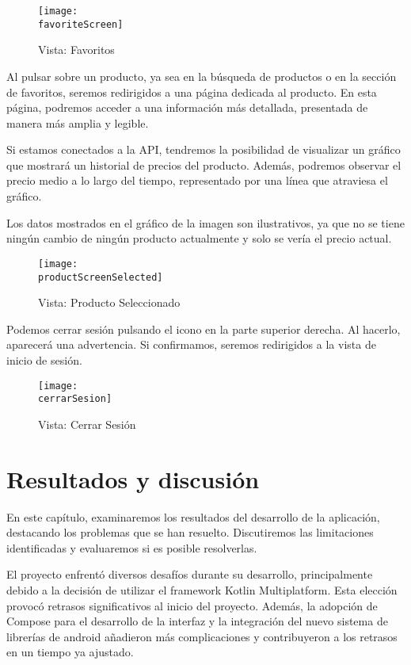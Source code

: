 \documentclass[12pt,twoside,titlepage]{report}
\newcommand{\favoriteScreen}{images/favorite_screen.png}
\newcommand{\cerrarSesion}{images/cerrar_sesion.png}
\newcommand{\productScreenSelected}{images/on_product_click.png}
\begin{document}
\begin{figure}[H]
    \centering
	\texttt{[image: \\favoriteScreen]}
    \caption{Vista: Favoritos}
    \label{fig:Google_SingIn}
\end{figure}

Al pulsar sobre un producto, ya sea en la búsqueda de productos o en la sección de favoritos, seremos redirigidos a una página dedicada al producto. En esta página, podremos acceder a una información más detallada, presentada de manera más amplia y legible.

Si estamos conectados a la API, tendremos la posibilidad de visualizar un gráfico que mostrará un historial de precios del producto. Además, podremos observar el precio medio a lo largo del tiempo, representado por una línea que atraviesa el gráfico. 

Los datos mostrados en el gráfico de la imagen son ilustrativos, ya que no se tiene ningún cambio de ningún producto actualmente y solo se vería el precio actual. 

\begin{figure}[H]
    \centering
	\texttt{[image: \\productScreenSelected]}
    \caption{Vista: Producto Seleccionado}
    \label{fig:ProductScreen}
\end{figure}

Podemos cerrar sesión pulsando el icono en la parte superior derecha. Al hacerlo, aparecerá una advertencia. Si confirmamos, seremos redirigidos a la vista de inicio de sesión.

\begin{figure}[H]
    \centering
	\texttt{[image: \\cerrarSesion]}
    \caption{Vista: Cerrar Sesión}
    \label{fig:Google_SingIn}
\end{figure}

\chapter{Resultados y discusión}
\label{sec:resulObtenidos}

En este capítulo, examinaremos los resultados del desarrollo de la aplicación, destacando los problemas que se han resuelto. Discutiremos las limitaciones identificadas y evaluaremos si es posible resolverlas.

El proyecto enfrentó diversos desafíos durante su desarrollo, principalmente debido a la decisión de utilizar el framework Kotlin Multiplatform. Esta elección provocó retrasos significativos al inicio del proyecto. Además, la adopción de Compose para el desarrollo de la interfaz y la integración del nuevo sistema de librerías de android añadieron más complicaciones y contribuyeron a los retrasos en un tiempo ya ajustado.
\end{document}
